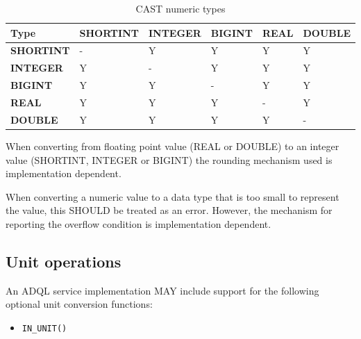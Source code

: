 \documentclass[11pt,a4paper]{ivoa}
\begin{document}
\begin{table}[thm]\footnotesize
    \begin{tabular}{
        |p{}
        |p{}
        |p{}
        |p{}
        |p{}
        |p{}
        |}
       
        \hline
        \textbf{Type} &
        \textbf{SHORTINT} &
        \textbf{INTEGER} &
        \textbf{BIGINT} &
        \textbf{REAL} &
        \textbf{DOUBLE}
        \tabularnewline

        \hline
        \textbf{SHORTINT} &
        - &
        Y &
        Y &
        Y &
        Y
        \tabularnewline

        \hline
        \textbf{INTEGER} &
        Y &
        - &
        Y &
        Y &
        Y
        \tabularnewline

        \hline
        \textbf{BIGINT} &
        Y &
        Y &
        - &
        Y &
        Y
        \tabularnewline

        \hline
        \textbf{REAL} &
        Y &
        Y &
        Y &
        - &
        Y
        \tabularnewline

        \hline
        \textbf{DOUBLE} &
        Y &
        Y &
        Y &
        Y &
        -
        \tabularnewline

        \hline
    \end{tabular}
    \caption{CAST numeric types}
    \label{table:adql.cast.numeric}
\end{table}

When converting from floating point value (REAL or DOUBLE) to an integer
value (SHORTINT, INTEGER or BIGINT) the rounding mechanism used is
implementation dependent.

When converting a numeric value to a data type that is too small to represent
the value, this SHOULD be treated as an error. However, the mechanism for
reporting the overflow condition is implementation dependent.

\subsection{Unit operations}
\label{sec:unit}

An ADQL service implementation MAY include support for the following optional
unit conversion functions:

\begin{itemize}
    \item \verb:IN_UNIT():
\end{itemize}
\end{document}

